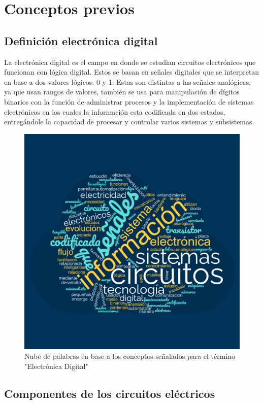 \chapter{Conceptos previos}
\section{Definición electrónica digital}
La electrónica digital es el campo en donde se estudian circuitos electrónicos que funcionan con lógica digital. Estos se basan en señales digitales que se interpretan en base a dos valores lógicos: 0 y 1. Estas son distintas a las señales analógicas, ya que usan rangos de valores, también se usa para manipulación de dígitos binarios con la función de administrar procesos y la implementación de sistemas electrónicos en los cuales la información esta codificada en dos estados, entregándole la capacidad de procesar y controlar varios sistemas y subsistemas.


\begin{figure}[hbt!]
  \centering
  \includegraphics[width=\textwidth]{electronicadigital.png}
  \caption{Nube de palabras en base a los conceptos señalados para el término "Electrónica Digital"}
\end{figure}

\section{Componentes de los circuitos eléctricos} %

